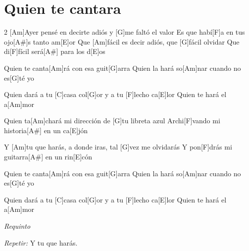 \section{Quien te cantara}

\noindent
\chordAm
\chordG
\chordF
\chordAsh
\chordE
\chordC

\vspace{1cm}

\begin{guitar}
	\begin{multicols}{2}
		[Am]Ayer pensé en decirte adiós y [G]me faltó el valor
		Es que habí[F]a en tus ojo[A#]s tanto am[E]or
		Que [Am]fácil es decir adiós, que [G]fácil olvidar
		Que di[F]fícil será[A#] para los d[E]os


		Quien te canta[Am]rá con esa guit[G]arra
		Quien la hará so[Am]nar cuando no es[G]té yo


		Quien dará a tu [C]casa col[G]or y a tu [F]lecho ca[E]lor
		Quien te hará el a[Am]mor


		Quien ta[Am]chará mi dirección de [G]tu libreta azul
		Archi[F]vando mi historia[A#] en un ca[E]jón


		Y [Am]tu que harás, a donde iras, tal [G]vez me olvidarás
		Y pon[F]drás mi guitarra[A#] en un rin[E]cón


		Quien te canta[Am]rá con esa guit[G]arra
		Quien la hará so[Am]nar cuando no es[G]té yo


		Quien dará a tu [C]casa col[G]or y a tu [F]lecho ca[E]lor
		Quien te hará el a[Am]mor


		\textit{Requinto}


		\textit{Repetir:}
		Y tu que harás.
	\end{multicols}
\end{guitar}
